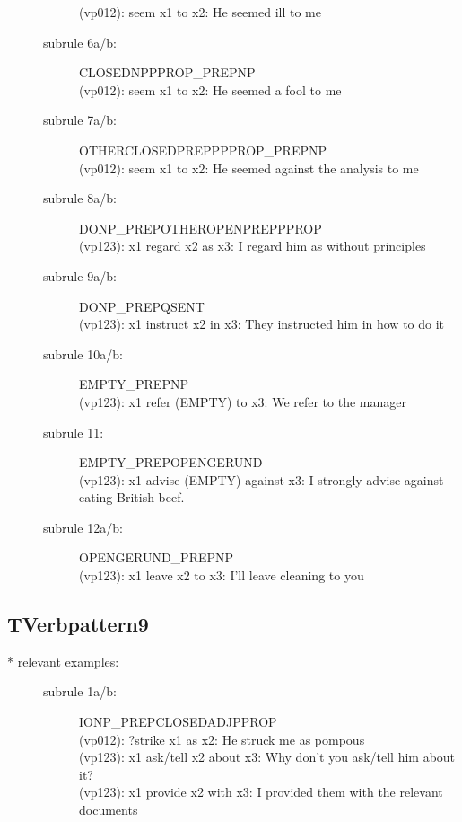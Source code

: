 \begin{description}
\begin{description}
  (vp012): seem x1 to x2: He seemed ill to me
\item[subrule 6a/b:] CLOSEDNPPPROP\_PREPNP\\
  (vp012): seem x1 to x2: He seemed a fool to me
\item[subrule 7a/b:] OTHERCLOSEDPREPPPPROP\_PREPNP\\
  (vp012): seem x1 to x2: He seemed against the analysis to me
\item[subrule 8a/b:] DONP\_PREPOTHEROPENPREPPPROP\\
  (vp123): x1 regard x2 as x3: I regard him as without principles
\item[subrule 9a/b:] DONP\_PREPQSENT\\
  (vp123): x1 instruct x2 in x3: They instructed him in how to do it
\item[subrule 10a/b:] EMPTY\_PREPNP\\
  (vp123): x1 refer (EMPTY) to x3: We refer to the manager \\
\item[subrule 11:] EMPTY\_PREPOPENGERUND\\
  (vp123): x1 advise (EMPTY) against x3: I strongly advise against eating 
British beef.
\item[subrule 12a/b:]OPENGERUND\_PREPNP\\
  (vp123): x1 leave x2 to x3: I'll leave cleaning to you\\
\end{description}
\end{description}

\subsection{TVerbpattern9}
\begin{description}
\item[* relevant examples:] \mbox{}
\begin{description}
 \item[subrule 1a/b:] IONP\_PREPCLOSEDADJPPROP\\
  (vp012): ?strike x1 as x2: He struck me as pompous\\
  (vp123): x1 ask/tell x2 about x3: Why don't you ask/tell him about it?\\
  (vp123): x1 provide x2 with x3: I provided them with the relevant documents\\
\end{description}
\end{description}

